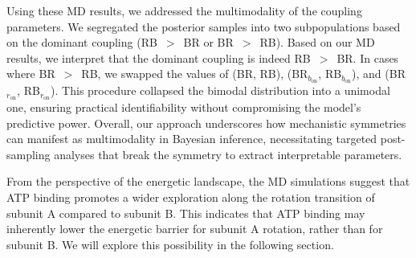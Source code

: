 \documentclass[pdflatex,sn-nature]{sn-jnl}%
\begin{document}
Using these MD results, we addressed the multimodality of the coupling parameters. We segregated the posterior samples into two subpopulations based on the dominant coupling (RB~$>$~BR or BR~$>$~RB). Based on our MD results, we interpret that the dominant coupling is indeed RB~$>$~BR. In cases where BR~$>$~RB, we swapped the values of (BR, RB), (BR$_{b_{\text{on}}}$, RB$_{b_{\text{on}}}$), and (BR$_{r_{\text{on}}}$, RB$_{r_{\text{on}}}$). This procedure collapsed the bimodal distribution into a unimodal one, ensuring practical identifiability without compromising the model's predictive power. Overall, our approach underscores how mechanistic symmetries can manifest as multimodality in Bayesian inference, necessitating targeted post-sampling analyses that break the symmetry to extract interpretable parameters.

From the perspective of the energetic landscape, the MD simulations suggest that ATP binding promotes a wider exploration along the rotation transition of subunit A compared to subunit B. This indicates that ATP binding may inherently lower the energetic barrier for subunit A rotation, rather than for subunit B. We will explore this possibility in the following section.
\end{document}
